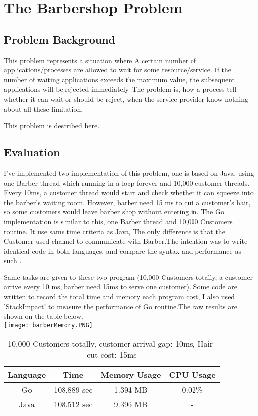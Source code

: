 \documentclass[a4paper,10pt]{article}
\begin{document}
\newpage
\section{The Barbershop Problem}
\subsection{Problem Background}
This problem represents a situation where A certain number of applications/processes are allowed to wait for some resource/service. If the number of waiting applications exceeds the maximum value, the subsequent applications will be rejected immediately. The problem is, how a process tell whether it can wait or should be reject, when the service provider know nothing about all these limitation.


This problem is described \href{http://greenteapress.com/semaphores/LittleBookOfSemaphores.pdf#section.5.2}{here}.

\subsection{Evaluation}
I've implemented two implementation of this problem, one is based on Java, using one Barber thread which running in a loop forever and 10,000 customer threads. Every 10ms, a customer thread would start and check whether it can squeeze into the barber's waiting room. However, barber need 15 ms to cut a customer's hair, so some customers would leave barber shop without entering in. The Go implementation is similar to this, one Barber thread and 10,000 Customers routine. It use same time criteria as Java, The only difference is that the Customer used channel to communicate with Barber.The intention was to write identical code in both languages, and compare the syntax and performance as such .

Same tasks are given to these two program (10,000 Customers totally, a customer arrive every 10 ms, barber need 15ms to serve one customer). Some code are written to record the total time and memory each program cost, I also used 'StackImpact' to measure the performance of Go routine.The raw results are shown on the table below.\\
\texttt{[image: barberMemory.PNG]}\\
\begin{table}[h]
    \centering
    \begin{tabular}{|c|c|c|c|}
    \hline
        \textbf{Language} & \textbf{Time}& \textbf{Memory Usage}& \textbf{CPU Usage}\\\hline
        Go & 108.889 sec & 1.394 MB & 0.02\%\\\hline
        Java & 108.512 sec & 9.396 MB & -\\\hline
    \end{tabular}
    \caption{10,000 Customers totally, customer arrival gap: 10ms, Hair-cut cost: 15ms}
\end{table}
\end{document}
